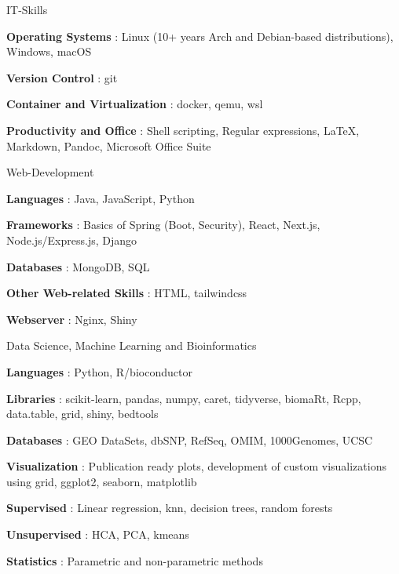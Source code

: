 \begin{cvskills}

    \cvskill
        { IT-Skills }
        {
            \begin{cvitems}
                \item {\textbf{ Operating Systems }: Linux (10+ years Arch and Debian-based distributions), Windows, macOS}
                \item {\textbf{ Version Control }: git}
                \item {\textbf{ Container and Virtualization }: docker, qemu, wsl}
                \item {\textbf{ Productivity and Office }: Shell scripting, Regular expressions, LaTeX, Markdown, Pandoc, Microsoft Office Suite}
                
            \end{cvitems}
        }

    \cvskill
        { Web-Development }
        {
            \begin{cvitems}
                \item {\textbf{ Languages }: Java, JavaScript, Python}
                \item {\textbf{ Frameworks }: Basics of Spring (Boot, Security), React, Next.js, Node.js/Express.js, Django}
                \item {\textbf{ Databases }: MongoDB, SQL}
                \item {\textbf{ Other Web-related Skills }: HTML, tailwindcss}
                \item {\textbf{ Webserver }: Nginx, Shiny}
                
            \end{cvitems}
        }

    \cvskill
        { Data Science, Machine Learning and Bioinformatics }
        {
            \begin{cvitems}
                \item {\textbf{ Languages }: Python, R/bioconductor}
                \item {\textbf{ Libraries }: scikit-learn, pandas, numpy, caret, tidyverse, biomaRt, Rcpp, data.table, grid, shiny, bedtools}
                \item {\textbf{ Databases }: GEO DataSets, dbSNP, RefSeq, OMIM, 1000Genomes, UCSC}
                \item {\textbf{ Visualization }: Publication ready plots, development of custom visualizations using grid, ggplot2, seaborn, matplotlib}
                \item {\textbf{ Supervised }: Linear regression, knn, decision trees, random forests}
                \item {\textbf{ Unsupervised }: HCA, PCA, kmeans}
                \item {\textbf{ Statistics }: Parametric and non-parametric methods}
                

\end{cvitems}}
\end{cvskills}
